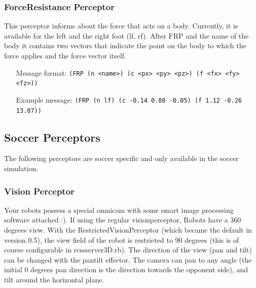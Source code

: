 \subsubsection{ForceResistance Perceptor}
\label{sec:FRP}

This perceptor informs about the force that acts on a body. Currently, it is
available for the left and the right foot (lf, rf).
After FRP and the name of the body it contains two vectors that indicate the
point on the body to which the force applies and the force vector itself.



\begin{itemize}
	\item[Message format:] \texttt{(FRP (n <name>) (c <px> <py> <pz>) (f <fx> <fy>
	<fz>))}
	\item[Example message:] \texttt{(FRP (n lf) (c -0.14 0.08 -0.05) (f 1.12 -0.26
	13.07))}
\end{itemize}

\subsection{Soccer Perceptors}
\label{sec:soccerperceptors}

The following perceptors are soccer specific and only available in the soccer
simulation.

\subsubsection{Vision Perceptor}
\label{sec:visionperceptor}

Your robots possess a special omnicam with some smart image processing
software attached :). If using the regular visionperceptor, Robots
have a 360 degrees view. With the RestrictedVisionPerceptor (which
became the default in version 0.5), the view field of the robot is
restricted to 90 degrees (this is of course configurable in
rcssserver3D.rb). The direction of the view (pan and tilt) can be
changed with the pantilt effector. The camera can pan to any angle
(the initial 0 degrees pan direction is the direction towards the
opponent side), and tilt around the horizontal plane.

